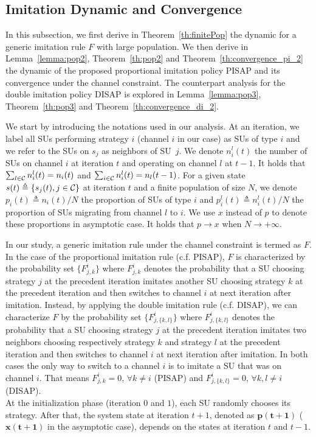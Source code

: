 \documentclass[12pt, onecolumn]{IEEEtran}
\theoremstyle{plain}
\theoremstyle{definition}
\begin{document}
\subsection{Imitation Dynamic and Convergence}
\label{subsec:dynamicsScenario2}



In this subsection, we first derive in Theorem~\ref{th:finitePop} the dynamic for a generic imitation rule $F$ with large population. We then derive in Lemma~\ref{lemma:pop2}, Theorem~\ref{th:pop2} and Theorem~\ref{th:convergence_pi_2} the dynamic of the proposed proportional imitation policy PISAP and its convergence under the channel constraint. The counterpart analysis for the double imitation policy DISAP is explored in Lemma~\ref{lemma:pop3}, Theorem~\ref{th:pop3} and Theorem~\ref{th:convergence_di_2}.







We start by introducing the notations used in our analysis. At an iteration, we label all SUs performing strategy $i$ (channel $i$ in our case) as SUs of type $i$ and we refer to the SUs on $s_j$ as neighbors of SU~$j$. We denote $n_{i}^l(t)$ the number of SUs on channel $i$ at iteration $t$ and operating on channel $l$ at $t-1$. It holds that $\sum_{l\in{\cal C}} n_i^l(t) = n_i(t)$ and $\sum_{i\in{\cal C}} n_i^l(t) = n_l(t-1)$. For a given state $s(t)\triangleq\{s_j(t), j\in{\cal C}\}$ at iteration $t$ and a finite population of size $N$, we denote
$p_i(t)\triangleq n_i(t)/N$ the proportion of SUs of type $i$ and $p_{i}^l(t)\triangleq n_i^l(t)/N$ the proportion of SUs migrating from channel $l$ to $i$. We use $x$ instead of $p$ to denote these proportions in asymptotic case. It holds that $p\rightarrow x$ when $N\rightarrow +\infty$.




In our study, a generic imitation rule under the channel constraint is termed as $F$. In the case of the proportional imitation rule (c.f. PISAP), $F$ is characterized by the probability set
$\{F_{j,k}^i\}$ where $F_{j,k}^i$ denotes the probability that a SU choosing strategy $j$ at the precedent iteration imitates another SU choosing strategy $k$ at the precedent iteration and
then switches to channel $i$ at next iteration after imitation. Instead, by applying the double imitation rule (c.f. DISAP), we can characterize $F$ by the probability set $\{F_{j,\{k,l\} }^i\}$
where $F_{j,\{k,l\} }^i$ denotes the probability that a SU choosing strategy $j$ at the precedent iteration imitates two neighbors choosing respectively strategy $k$ and strategy $l$ at the
precedent iteration and then switches to channel $i$
at next iteration after imitation. In both cases the only way to switch to a channel $i$ is to imitate a SU that was on channel $i$. That means $F_{j,k}^i=0$, $\forall k\ne i$ (PISAP)
and $F_{j,\{k,l\} }^i=0$, $\forall k,l\ne i$ (DISAP). \\
At the initialization phase (iteration $0$ and $1$), each SU randomly chooses its strategy. After that, the system state at iteration $t+1$, denoted
as $\mathbf{p(t+1)}$ ($\mathbf{x(t+1)}$ in the asymptotic case), depends on the states at iteration $t$ and $t-1$.
\end{document}
